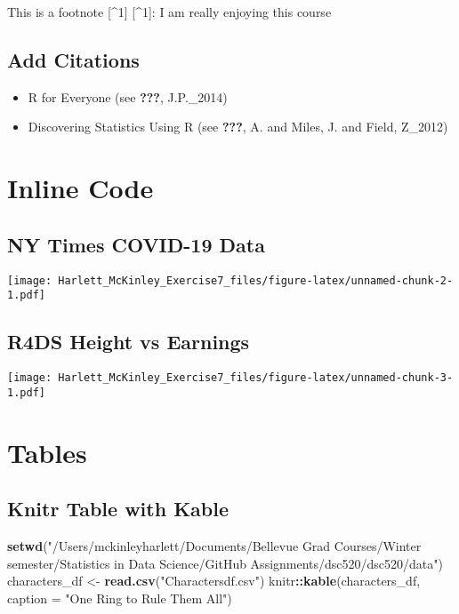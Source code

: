 \documentclass[
]{article}
\newenvironment{Shaded}{\begin{snugshade}}{\end{snugshade}}
\newcommand{\DataTypeTok}[1]{\textcolor[rgb]{0.13,0.29,0.53}{#1}}
\newcommand{\KeywordTok}[1]{\textcolor[rgb]{0.13,0.29,0.53}{\textbf{#1}}}
\newcommand{\NormalTok}[1]{#1}
\newcommand{\OperatorTok}[1]{\textcolor[rgb]{0.81,0.36,0.00}{\textbf{#1}}}
\newcommand{\StringTok}[1]{\textcolor[rgb]{0.31,0.60,0.02}{#1}}
\providecommand{\tightlist}{%
  \setlength{\itemsep}{0pt}\setlength{\parskip}{0pt}}
\begin{document}
This is a footnote {[}\^{}1{]} {[}\^{}1{]}: I am really enjoying this
course

\hypertarget{add-citations}{%
\subsection{Add Citations}\label{add-citations}}

\begin{itemize}
\tightlist
\item
  R for Everyone (see {\textbf{???}}, J.P.\_2014)
\item
  Discovering Statistics Using R (see {\textbf{???}}, A. and Miles, J.
  and Field, Z\_2012)
\end{itemize}

\hypertarget{inline-code}{%
\section{Inline Code}\label{inline-code}}

\hypertarget{ny-times-covid-19-data}{%
\subsection{NY Times COVID-19 Data}\label{ny-times-covid-19-data}}

\texttt{[image: Harlett\_McKinley\_Exercise7\_files/figure-latex/unnamed-chunk-2-1.pdf]}

\hypertarget{r4ds-height-vs-earnings}{%
\subsection{R4DS Height vs Earnings}\label{r4ds-height-vs-earnings}}

\texttt{[image: Harlett\_McKinley\_Exercise7\_files/figure-latex/unnamed-chunk-3-1.pdf]}

\hypertarget{tables}{%
\section{Tables}\label{tables}}

\hypertarget{knitr-table-with-kable}{%
\subsection{Knitr Table with Kable}\label{knitr-table-with-kable}}

\begin{Shaded}
\begin{Highlighting}[]
\KeywordTok{setwd}\NormalTok{(}\StringTok{"/Users/mckinleyharlett/Documents/Bellevue Grad Courses/Winter semester/Statistics in Data Science/GitHub Assignments/dsc520/dsc520/data"}\NormalTok{)}
\NormalTok{characters_df <-}\StringTok{ }\KeywordTok{read.csv}\NormalTok{(}\StringTok{"Charactersdf.csv"}\NormalTok{)}
\NormalTok{knitr}\OperatorTok{::}\KeywordTok{kable}\NormalTok{(characters_df, }\DataTypeTok{caption =} \StringTok{"One Ring to Rule Them All"}\NormalTok{)}
\end{Highlighting}
\end{Shaded}
\end{document}
